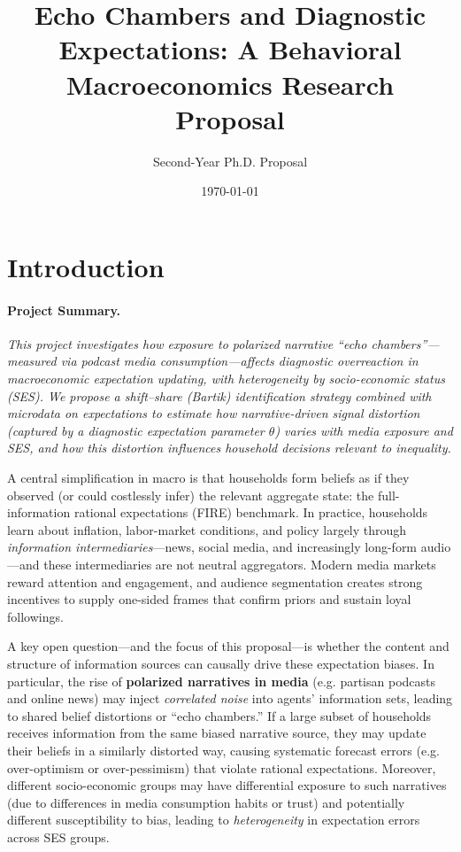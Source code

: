 \documentclass[12pt]{article}
\title{Echo Chambers and Diagnostic Expectations: A Behavioral Macroeconomics Research Proposal} \author{Second-Year Ph.D. Proposal} \date{\today}
\begin{document}
\maketitle

\section{Introduction}

\paragraph{Project Summary.} \emph{This project investigates how exposure to polarized narrative ``echo chambers''---measured via podcast media consumption---affects diagnostic overreaction in macroeconomic expectation updating, with heterogeneity by socio-economic status (SES). We propose a shift--share (Bartik) identification strategy combined with microdata on expectations to estimate how narrative-driven signal distortion (captured by a diagnostic expectation parameter $\theta$) varies with media exposure and SES, and how this distortion influences household decisions relevant to inequality.}

A central simplification in macro is that households form beliefs as if they observed (or could costlessly infer) the relevant aggregate state: the full-information rational expectations (FIRE) benchmark. In practice, households learn about inflation, labor-market conditions, and policy largely through \emph{information intermediaries}---news, social media, and increasingly long-form audio---and these intermediaries are not neutral aggregators. Modern media markets reward attention and engagement, and audience segmentation creates strong incentives to supply one-sided frames that confirm priors and sustain loyal followings.

A key open question---and the focus of this proposal---is whether the content and structure of information sources can causally drive these expectation biases. In particular, the rise of \textbf{polarized narratives in media} (e.g. partisan podcasts and online news) may inject \emph{correlated noise} into agents' information sets, leading to shared belief distortions or ``echo chambers.'' If a large subset of households receives information from the same biased narrative source, they may update their beliefs in a similarly distorted way, causing systematic forecast errors (e.g. over-optimism or over-pessimism) that violate rational expectations. Moreover, different socio-economic groups may have differential exposure to such narratives (due to differences in media consumption habits or trust) and potentially different susceptibility to bias, leading to \emph{heterogeneity} in expectation errors across SES groups.
\end{document}
